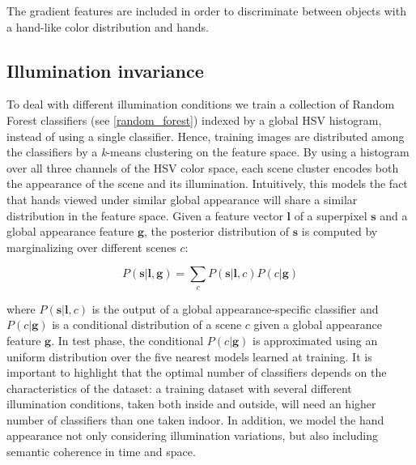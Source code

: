 The gradient features are included in order to discriminate between objects with a hand-like color distribution and hands.

\subsection{Illumination invariance}
To deal with different illumination conditions we train a collection of Random Forest classifiers (see \ref{random_forest}) indexed by a global HSV histogram, instead of using a single classifier. Hence, training images are distributed among the classifiers by a \textsl{k}-means clustering on the feature space. By using a histogram over all three channels of the HSV color space, each scene cluster encodes both the appearance of the scene and its illumination. Intuitively, this models the fact that hands viewed under similar global appearance will share a similar distribution in the feature space. Given a feature vector $\mathbf{l}$ of a superpixel $\mathbf{s}$ and a global appearance
feature $\mathbf{g}$, the posterior distribution of $\mathbf{s}$
is computed by marginalizing over different scenes $c$:

\begin{equation}
P(\mathbf{s}|\mathbf{l},\mathbf{g})=\sum_{c}P(\mathbf{s}|\mathbf{l},c)P(c|\mathbf{g})
\end{equation}


where $P(\mathbf{s}|\mathbf{l},c)$ is the output of a global appearance-specific
classifier and $P(c|\mathbf{g})$ is a conditional distribution of a
scene $c$ given a global appearance feature $\mathbf{g}$. In test
phase, the conditional $P(c|\mathbf{g})$ is approximated using an
uniform distribution over the five nearest models learned at training.
It is important to highlight that the optimal number of classifiers
depends on the characteristics of the dataset: a training dataset
with several different illumination conditions, taken both inside and
outside, will need an higher number of classifiers than one taken indoor.
In addition, we model the hand appearance not
only considering illumination variations, but also including semantic coherence in time and space.


